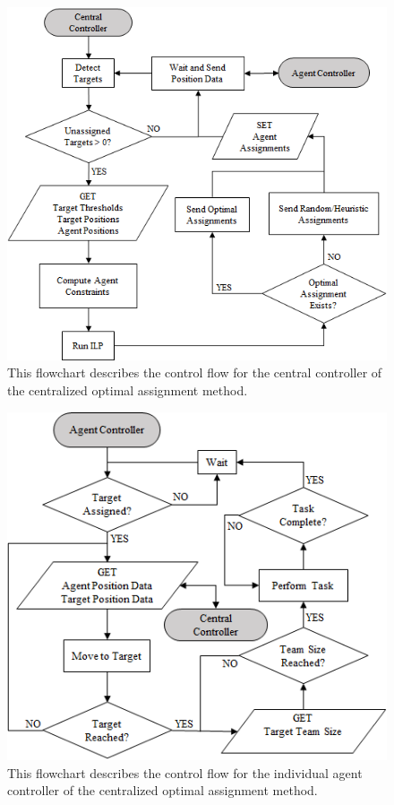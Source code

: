 \documentclass[defaultstyle,12pt]{thesis}
\begin{document}
\begin{figure}[!ht]
\centering\includegraphics[width=.65\columnwidth]{../assets/CentralController.png}
\centering\caption{This flowchart describes the control flow for the central controller of the centralized optimal assignment method.}\label{fig:centralcontrol}
\end{figure}

\begin{figure}[!ht]
\centering\includegraphics[width=.65\columnwidth]{../assets/AgentController.png}
\centering\caption{This flowchart describes the control flow for the individual agent controller of the centralized optimal assignment method.}\label{fig:centralagentcontrol}
\end{figure}
\end{document}
